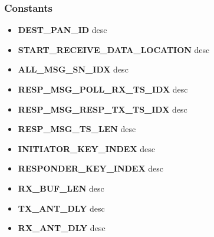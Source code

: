 \subsubsection{Constants}
\begin{itemize}
	\item \textbf{DEST\_PAN\_ID}
	\newline
	desc
	\item \textbf{START\_RECEIVE\_DATA\_LOCATION}
	\newline
	desc
	\item \textbf{ALL\_MSG\_SN\_IDX}
	\newline
	desc
	\item \textbf{RESP\_MSG\_POLL\_RX\_TS\_IDX}
	\newline
	desc
	\item \textbf{RESP\_MSG\_RESP\_TX\_TS\_IDX}
	\newline
	desc
	\item \textbf{RESP\_MSG\_TS\_LEN}
	\newline
	desc
	\item \textbf{INITIATOR\_KEY\_INDEX}
	\newline
	desc
	\item \textbf{RESPONDER\_KEY\_INDEX}
	\newline
	desc
	\item \textbf{RX\_BUF\_LEN}
	\newline
	desc
	\item \textbf{TX\_ANT\_DLY}
	\newline
	desc
	\item \textbf{RX\_ANT\_DLY}
	\newline
	desc
\end{itemize}


